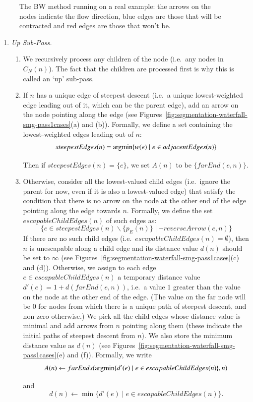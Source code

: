 \documentclass[preprint,a4paper]{elsarticle}
\newcommand{\argmin}{\operatornamewithlimits{argmin}}
\newenvironment{stusubfig}[1]
{
	\begin{figure}[#1]
	\begin{center}
}
{
	\end{center}
	\end{figure}
}
\begin{document}
\begin{stusubfig}{!t}
\caption[The BW method running on a real example]{The BW method running on a real example: the arrows on the nodes indicate the flow direction, blue edges are those that will be contracted and red edges are those that won't be.}
\label{fig:segmentation-waterfall-smg-example}
\end{stusubfig}

\begin{enumerate}

\item \emph{Up Sub-Pass.}

\begin{enumerate}
\item We recursively process any children of the node (i.e.~any nodes in $C_N(n)$). The fact that the children are processed first is why this is called an `up' sub-pass.

\item If $n$ has a unique edge of steepest descent (i.e.~a unique lowest-weighted edge leading out of it, which can be the parent edge), add an arrow on the node pointing along the edge (see Figures~\ref{fig:segmentation-waterfall-smg-pass1cases}(a) and (b)). Formally, we define a set containing the lowest-weighted edges leading out of $n$:
%
\[
steepestEdges(n) = \argmin_{}\{w(e) \; | \; e \in adjacentEdges(n)\}
\]
%
Then if $steepestEdges(n) = \{e\}$, we set $A(n)$ to be $\{farEnd(e,n)\}$.

\item Otherwise, consider all the lowest-valued child edges (i.e.~ignore the parent for now, even if it is also a lowest-valued edge) that satisfy the condition that there is no arrow on the node at the other end of the edge pointing along the edge towards $n$. Formally, we define the set $escapableChildEdges(n)$ of such edges as:
%
\[
\{e \in steepestEdges(n) \backslash \{p_E(n)\} \; | \; \neg reverseArrow(e,n)\}
\]
%
If there are no such child edges (i.e.~$escapableChildEdges(n) = \emptyset$), then $n$ is unescapable along a child edge and its distance value $d(n)$ should be set to $\infty$ (see Figures~\ref{fig:segmentation-waterfall-smg-pass1cases}(c) and (d)). Otherwise, we assign to each edge $e \in escapableChildEdges(n)$ a temporary distance value $d'(e) = 1 + d(farEnd(e,n))$, i.e.~a value $1$ greater than the value on the node at the other end of the edge. (The value on the far node will be $0$ for nodes from which there is a unique path of steepest descent, and non-zero otherwise.) We pick all the child edges whose distance value is minimal and add arrows from $n$ pointing along them (these indicate the initial paths of steepest descent from $n$). We also store the minimum distance value as $d(n)$ (see Figures~\ref{fig:segmentation-waterfall-smg-pass1cases}(e) and (f)). Formally, we write
%
\[
A(n) \leftarrow farEnds(\argmin_{}\{d'(e) \; | \; e \in escapableChildEdges(n)\}, n)
\]
%
and
\[
d(n) \leftarrow \min_{}\{d'(e) \; | \; e \in escapableChildEdges(n)\}.
\]


\end{enumerate}
\end{enumerate}
\end{document}
